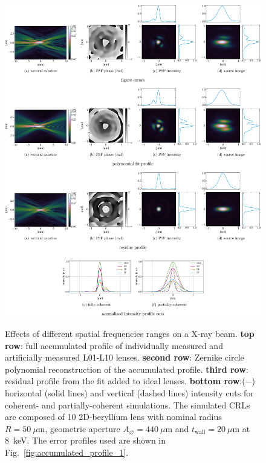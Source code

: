 \begin{refsection}
\begin{figure}[ht]
        \centering
        {\includegraphics[width=1\linewidth]{figures/ch05/CDnFF_LF_HH.pdf}}
        \caption[Effects of different spatial frequencies ranges on a X-ray beam]{Effects of different spatial frequencies ranges on a X-ray beam. \textbf{top row}: full accumulated profile of individually measured and artificially measured L01-L10 lenses. \textbf{second row}: Zernike circle polynomial reconstruction of the accumulated profile. \textbf{third row}: residual profile from the fit added to ideal lenses. \textbf{bottom row}:($-$)  horizontal (solid lines) and vertical (dashed lines) intensity cuts for coherent- and partially-coherent simulations. The simulated CRLs are composed of 10 2D-beryllium lens with nominal radius $R=50~\mu\text{m}$, geometric aperture $A_{\diameter}=440~\mu\text{m}$ and $t_\text{wall}=20~\mu$m at 8~keV. The error profiles used are shown in Fig.~\ref{fig:accumulated_profile_1}.}\label{fig:CDnFF_LF_HH}
\end{figure}


\end{refsection}
